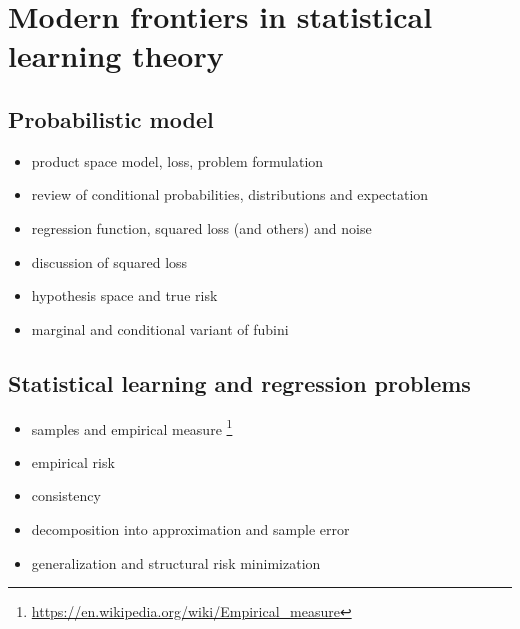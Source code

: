 \chapter{Modern frontiers in statistical learning theory}

\section{Probabilistic model}
\begin{itemize}
    \item product space model, loss, problem formulation 
        \cite{smale_learning}
    \item review of conditional probabilities, distributions 
        and expectation \cite{billingsley,dudley,royden}
    \item regression function, squared loss (and others) and 
        noise \cite{smale_learning}
    \item discussion of squared loss \cite{fitwithoutfear}
    \item hypothesis space and true risk 
        \cite{smale_learning}
    \item marginal and conditional variant of
        fubini \cite{dudley,billingsley}
\end{itemize}

\section{Statistical learning and regression problems}
\begin{itemize}
    \item samples and empirical measure
        \footnote{\url{https://en.wikipedia.org/wiki/Empirical_measure}}
    \item empirical risk
    \item consistency \cite{vapnik}
    \item decomposition into approximation and sample error 
        \cite{smale_learning}
    \item generalization and structural risk minimization
        \cite{vapnik}
\end{itemize}

